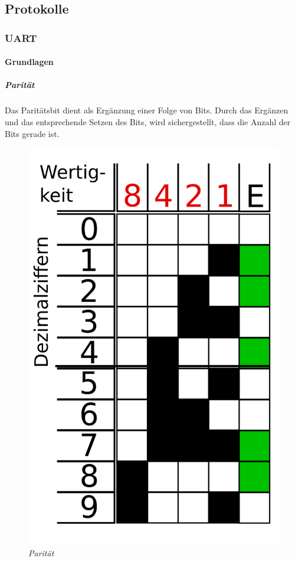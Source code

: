 \subsection{Protokolle}
\subsubsection{UART}
\paragraph{Grundlagen}
\subparagraph{Parität}
Das Paritätsbit dient als Ergänzung einer Folge von Bits. Durch das Ergänzen und das entsprechende Setzen des Bits, wird sichergestellt,
dass die Anzahl der Bits gerade ist.

\smallskip

\begin{figure}
     \vspace{-\baselineskip}
         \centering
         \includegraphics[scale=0.1]{Pictures/paritaet.png}
         \caption{\textit{Parität \citep{ImgParitaet}}}
         \label{img:paritaet}
 \end{figure}

